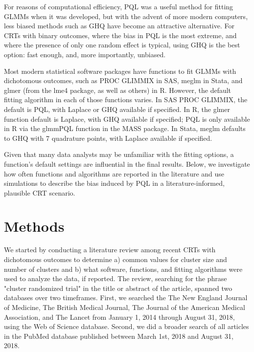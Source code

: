 \documentclass{article}
\begin{document}
\begin{flushleft}
For reasons of computational efficiency, PQL was a useful method for fitting GLMMs when it was developed, but with the advent of more modern computers, less biased methods such as GHQ have become an attractive alternative. For CRTs with binary outcomes, where the bias in PQL is the most extreme\cite{ng_estimation_2006}\cite{lin_estimation_2007}, and where the presence of only one random effect is typical, using GHQ is the best option: fast enough, and, more importantly, unbiased.

Most modern statistical software packages have functions to fit GLMMs with dichotomous outcomes, such as PROC GLIMMIX in SAS, meglm in Stata, and glmer (from the lme4 package, as well as others) in R. However, the default fitting algorithm in each of those functions varies. In SAS PROC GLIMMIX, the default is PQL, with Laplace or GHQ available if specified. In R, the glmer function default is Laplace, with GHQ available if specified; PQL is only available in R via the glmmPQL function in the MASS package. In Stata, meglm defaults to GHQ with 7 quadrature points, with Laplace available if specified.

Given that many data analysts may be unfamiliar with the fitting options, a function's default settings are influential in the final results. Below, we investigate how often functions and algorithms are reported in the literature and use simulations to describe the bias induced by PQL in a literature-informed, plausible CRT scenario.




\section{Methods}

We started by conducting a literature review among recent CRTs with dichotomous outcomes to determine a) common values for cluster size and number of clusters and b) what software, functions, and fitting algorithms were used to analyze the data, if reported. The review, searching for the phrase "cluster randomized trial" in the title or abstract of the article, spanned two databases over two timeframes. First, we searched the The New England Journal of Medicine, The British Medical Journal, The Journal of the American Medical Association, and The Lancet from January 1, 2014 through August 31, 2018, using the Web of Science database. Second, we did a broader search of all articles in the PubMed database published between March 1st, 2018 and August 31, 2018. 


\end{flushleft}
\end{document}
